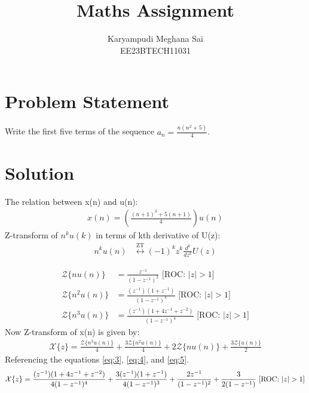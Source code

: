 \documentclass{article}
\begin{document}
\title{Maths Assignment}
\author{Karyampudi Meghana Sai\\ EE23BTECH11031}
\maketitle

\section*{Problem Statement}
Write the first five terms of the sequence \(a_n = \frac{n(n^2+5)}{4}\).

\section*{Solution}


The relation between x(n) and u(n):
\begin{align}
 x(n) = \left(\frac{(n+1)^3+5(n+1)}{4}\right) u(n)\label{eq:1}
 \end{align}
Z-transform of $n^ku(k)$ in terms of kth derivative of U(z):
\begin{align}
n^k u(n) &\overset{\text{ZT}}{\longleftrightarrow} (-1)^k z^k \frac{d^k}{dz^k}U(z)
\end{align}

\begin{align}
\mathcal{Z}\{nu(n)\} &= \frac{z^{-1}}{(1 - z^{-1})^2}\label{eq:3} \text{ [ROC: } \lvert z \rvert > 1\text{]} \\
\mathcal{Z}\{n^2u(n)\} &= \frac{(z^{-1})(1+z^{-1})}{(1-z^{-1})^3}\label{eq:4} \text{ [ROC: } \lvert z \rvert > 1\text{]} \\
\mathcal{Z}\{n^3u(n)\} &= \frac{(z^{-1})(1+4z^{-1}+z^{-2})}{(1-z^{-1})^4}\label{eq:5} \text{ [ROC: } \lvert z \rvert > 1\text{]}
\end{align}
Now Z-transform of x(n) is given by:
\begin{align}
\mathcal{X}\{z\} = \frac{\mathcal{Z}\{n^3u(n)\}}{4} + \frac{3\mathcal{Z}\{n^2u(n)\}}{4} + 2\mathcal{Z}\{nu(n)\} + \frac{3\mathcal{Z}\{u(n)\}}{2} 
\end{align}
Referencing the equations \eqref{eq:3}, \eqref{eq:4}, and \eqref{eq:5}.
\begin{equation}
\mathcal{X}\{z\} = \frac{(z^{-1})(1+4z^{-1}+z^{-2})}{4(1-z^{-1})^4} + \frac{3(z^{-1})(1+z^{-1})}{4(1-z^{-1})^3} + \frac{2z^{-1}}{(1 - z^{-1})^2} + \frac{3}{2(1- z^{-1})}\text{ [ROC: } \lvert z \rvert > 1\text{]}\\
\end{equation}
\end{document}
